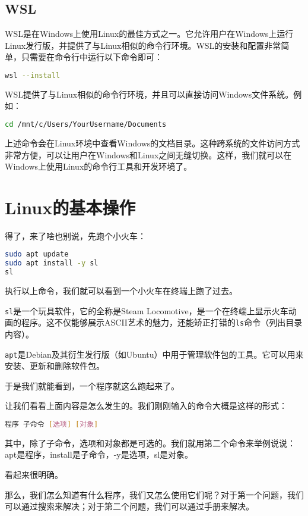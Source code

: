 \documentclass[../main.tex]{subfiles}
\begin{document}
\subsection{WSL}

WSL是在Windows上使用Linux的最佳方式之一。它允许用户在Windows上运行Linux发行版，并提供了与Linux相似的命令行环境。WSL的安装和配置非常简单，只需要在命令行中运行以下命令即可：
\begin{lstlisting}[language=bash]
    wsl --install
\end{lstlisting}
WSL提供了与Linux相似的命令行环境，并且可以直接访问Windows文件系统。例如：

\begin{lstlisting}[language=bash]
    cd /mnt/c/Users/YourUsername/Documents
\end{lstlisting}
上述命令会在Linux环境中查看Windows的文档目录。这种跨系统的文件访问方式非常方便，可以让用户在Windows和Linux之间无缝切换。这样，我们就可以在Windows上使用Linux的命令行工具和开发环境了。

\section{Linux的基本操作}

得了，来了啥也别说，先跑个小火车：

\begin{lstlisting}[language=bash]
sudo apt update
sudo apt install -y sl
sl
\end{lstlisting}

执行以上命令，我们就可以看到一个小火车在终端上跑了过去。

\texttt{sl}是一个玩具软件，它的全称是Steam Locomotive，是一个在终端上显示火车动画的程序。这不仅能够展示ASCII艺术的魅力，还能矫正打错的\texttt{ls}命令（列出目录内容）。

\texttt{apt}是Debian及其衍生发行版（如Ubuntu）中用于管理软件包的工具。它可以用来安装、更新和删除软件包。

于是我们就能看到，一个程序就这么跑起来了。

让我们看看上面内容是怎么发生的。我们刚刚输入的命令大概是这样的形式：
\begin{lstlisting}[language=bash]
程序 子命令 [选项] [对象]
\end{lstlisting}

其中，除了子命令，选项和对象都是可选的。我们就用第二个命令来举例说说：apt是程序，install是子命令，-y是选项，sl是对象。

看起来很明确。

那么，我们怎么知道有什么程序，我们又怎么使用它们呢？对于第一个问题，我们可以通过搜索来解决；对于第二个问题，我们可以通过手册来解决。
\end{document}
